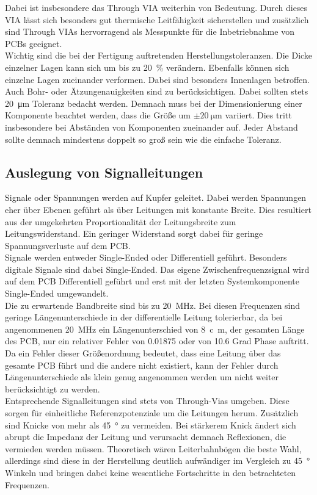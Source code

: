 Dabei ist insbesondere das Through VIA weiterhin von Bedeutung. Durch dieses VIA lässt sich besonders gut thermische Leitfähigkeit sicherstellen und zusätzlich sind Through VIAs hervorragend als Messpunkte für die Inbetriebnahme von PCBs geeignet. \\
Wichtig sind die bei der Fertigung auftretenden Herstellungstoleranzen. Die Dicke einzelner Lagen kann sich um bis zu \SI{20}{\percent} verändern. Ebenfalls können sich einzelne Lagen zueinander verformen. Dabei sind besonders Innenlagen betroffen. Auch Bohr- oder Ätzungenauigkeiten sind zu berücksichtigen. Dabei sollten stets \SI{20}{\micro\meter} Toleranz bedacht werden. Demnach muss bei der Dimensionierung einer Komponente beachtet werden, dass die Größe um $\pm \SI{20}{\micro\meter}$ variiert. Dies tritt insbesondere bei Abständen von Komponenten zueinander auf. Jeder Abstand sollte demnach mindestens doppelt so groß sein wie die einfache Toleranz.
\subsection{Auslegung von Signalleitungen}
Signale oder Spannungen werden auf Kupfer geleitet. Dabei werden Spannungen eher über Ebenen geführt als über Leitungen mit konstante Breite. Dies resultiert aus der umgekehrten Proportionalität der Leitungsbreite zum Leitungswiderstand. Ein geringer Widerstand sorgt dabei für geringe Spannungsverluste auf dem PCB.\\
Signale werden entweder Single-Ended oder Differentiell geführt. Besonders digitale Signale sind dabei Single-Ended. Das eigene Zwischenfrequenzsignal wird auf dem PCB Differentiell geführt und erst mit der letzten Systemkomponente Single-Ended umgewandelt.\\
Die zu erwartende Bandbreite sind bis zu \SI{20}{\mega\hertz}. Bei diesen Frequenzen sind geringe Längenunterschiede in der differentielle Leitung tolerierbar, da bei angenommenen \SI{20}{\mega\hertz} ein Längenunterschied von \SI{8}{c\meter}, der gesamten Länge des PCB, nur ein relativer Fehler von 0.01875 oder von 10.6 Grad Phase auftritt. Da ein Fehler dieser Größenordnung bedeutet, dass eine Leitung über das gesamte PCB führt und die andere nicht existiert, kann der Fehler durch Längenunterschiede als klein genug angenommen werden um nicht weiter berücksichtigt zu werden.\\
Entsprechende Signalleitungen sind stets von Through-Vias umgeben. Diese sorgen für einheitliche Referenzpotenziale um die Leitungen herum. Zusätzlich sind Knicke von mehr als \SI{45}{\degree} zu vermeiden. Bei stärkerem Knick ändert sich abrupt die Impedanz der Leitung und verursacht demnach Reflexionen, die vermieden werden müssen. Theoretisch wären Leiterbahnbögen die beste Wahl, allerdings sind diese in der Herstellung deutlich aufwändiger im Vergleich zu \SI{45}{\degree} Winkeln und bringen dabei keine wesentliche Fortschritte in den betrachteten Frequenzen.\\